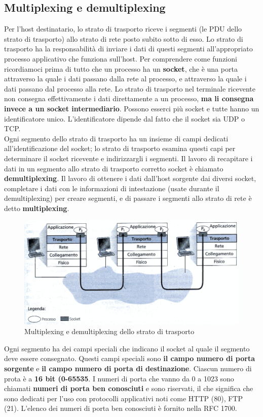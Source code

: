 \documentclass[11pt,a4paper]{article}
\begin{document}
\subsection{Multiplexing e demultiplexing}
Per l'host destinatario, lo strato di trasporto riceve i segmenti (le PDU dello strato di trasporto) allo strato di rete posto subito sotto di esso. Lo strato di trasporto ha la responsabilità di inviare i dati di questi segmenti all'appropriato processo applicativo che funziona sull'host.
Per comprendere come funzioni ricordiamoci prima di tutto che un processo ha un \textbf{socket}, che è una porta attraverso la quale i dati passano dalla rete al processo, e attraverso la quale i dati passano dal processo alla rete. Lo strato di trasporto nel terminale ricevente non consegna effettivamente i dati direttamente a un processo, \textbf{ma li consegna invece a un socket intermediario}. Possono esserci più socket e tutte hanno un identificatore unico. L'identificatore dipende dal fatto che il socket sia UDP o TCP.\\
Ogni segmento dello strato di trasporto ha un insieme di campi dedicati all'identificazione del socket; lo strato di trasporto esamina questi capi per determinare il socket ricevente e indirizzargli i segmenti.
Il lavoro di recapitare i dati in un segmento allo strato di trasporto corretto socket è chiamato \textbf{demultiplexing}. Il lavoro di ottenere i dati dall'host sorgente dai diversi socket, completare i dati con le informazioni di intestazione (usate durante il demultiplexing) per creare segmenti, e di passare i segmenti allo strato di rete è detto \textbf{multiplexing}.
\begin{figure}
	\includegraphics[scale=0.6]{img/010.png}
	\caption{Multiplexing e demultiplexing dello strato di trasporto}
\end{figure}
Ogni segmento ha dei campi speciali che indicano il socket al quale il segmento deve essere consegnato. Questi campi speciali sono \textbf{il campo numero di porta sorgente}	e \textbf{il campo numero di porta di destinazione}. Ciascun numero di prota è a \textbf{16 bit (0-65535}. I numeri di porta che vanno da 0 a 1023 sono chiamati \textbf{numeri di porta ben conosciuti} e sono riservati, il che significa che sono dedicati per l'uso con protocolli applicativi noti come HTTP (80), FTP (21). L'elenco dei numeri di porta ben conosciuti è fornito nella RFC 1700.\\
\end{document}
